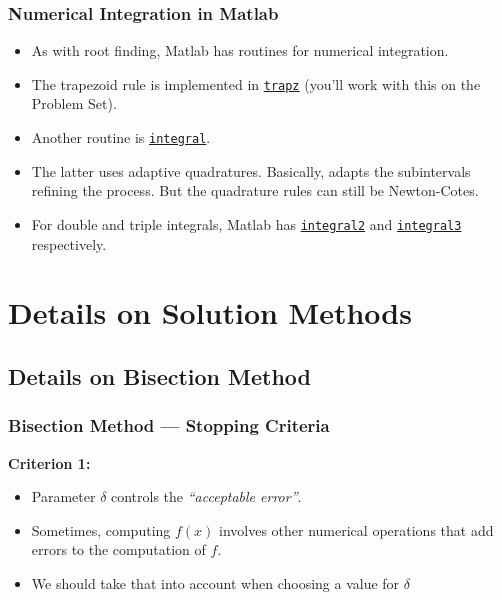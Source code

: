 \documentclass[11pt,xcolor={svgnames},aspectratio=169,usepdftitle=false,notheorems]{beamer}
\begin{document}
\begin{frame}
  \frametitle{Numerical Integration in Matlab}
\begin{itemize}
  \item As with root finding, Matlab has routines for numerical integration.
  \item The trapezoid rule is implemented in \href{https://www.mathworks.com/help/matlab/ref/trapz.html}{\texttt{trapz}} (you'll work with this on the Problem Set).
  \item Another routine is \href{https://www.mathworks.com/help/matlab/ref/integral.html}{\texttt{integral}}.
  \item The latter uses adaptive quadratures. Basically, adapts the subintervals refining the process. But the quadrature rules can still be Newton-Cotes.
  \item For double and triple integrals, Matlab has \href{https://www.mathworks.com/help/matlab/ref/integral2.html}{\texttt{integral2}} and \href{https://www.mathworks.com/help/matlab/ref/integral3.html}{\texttt{integral3}} respectively.
\end{itemize}
\end{frame}

\section{Details on Solution Methods}

\subsection{Details on Bisection Method}

\begin{frame}
  \frametitle{Bisection Method --- Stopping Criteria}
\alert{\textbf{Criterion 1:}}
\begin{itemize}
  \item Parameter $\delta$ controls the \textit{``acceptable error''}.
  \item Sometimes, computing $f(x)$ involves other numerical operations that add errors to the computation of $f$.
  \item We should take that into account when choosing a value for $\delta$
\end{itemize}
\end{frame}
\end{document}
